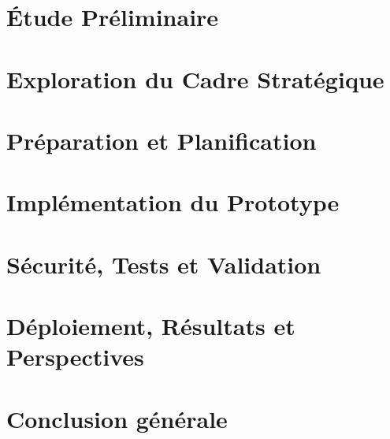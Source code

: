 \documentclass[12pt]{report}
\begin{document}



\chapter{Étude Préliminaire}



\chapter{Exploration du Cadre Stratégique}



\chapter{Préparation et Planification}



\chapter{Implémentation du Prototype}



\chapter{Sécurité, Tests et Validation}



\chapter{Déploiement, Résultats et Perspectives}



\chapter*{Conclusion générale}




\nocite{*}


\end{document}
